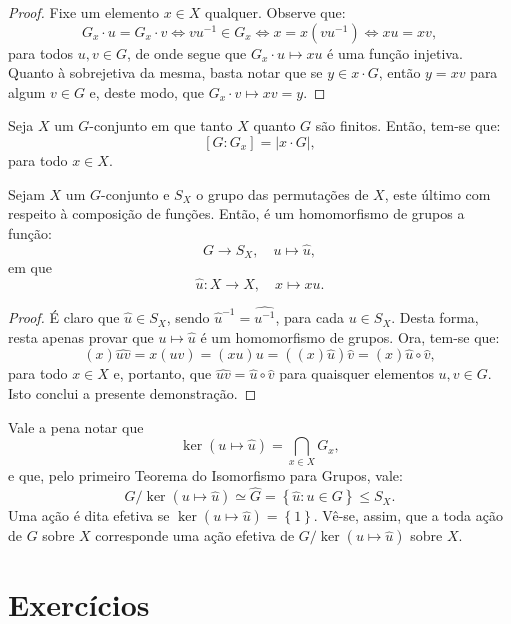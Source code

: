 \begin{proof}
  Fixe um elemento $x\in{X}$ qualquer. Observe que:
  \[
    G_{x}\cdot{u}=G_{x}\cdot{v}\iff{vu^{-1}\in{G_{x}}}\iff{x=x(vu^{-1})}\iff{xu=xv},
  \]
  para todos $u,v\in{G}$, de onde segue que $G_{x}\cdot{u}\mapsto{xu}$ é uma função injetiva. Quanto à sobrejetiva da mesma, basta notar que se $y\in{x\cdot{G}}$, então $y=xv$ para algum $v\in{G}$ e, deste modo, que $G_{x}\cdot{v}\mapsto{xv}=y$.
\end{proof}

\begin{corollary}
  Seja $X$ um $G$-conjunto em que tanto $X$ quanto $G$ são finitos. Então, tem-se que:
  \[
    [G:G_{x}]=|x\cdot{G}|,
  \]
  para todo $x\in{X}$.
\end{corollary}

\begin{proposition}
  Sejam $X$ um $G$-conjunto e $S_{X}$ o grupo das permutações de $X$, este último com respeito à composição de funções. Então, é um homomorfismo de grupos a função:
  \[
    G\to{S_{X}},\quad{u\mapsto\widehat{u}},
  \]
  em que
  \[
    \widehat{u}:X\to{X},\quad{x\mapsto{xu}}.
  \]
\end{proposition}

\begin{proof}
  É claro que $\widehat{u}\in{S_{X}}$, sendo $\widehat{u}^{-1}=\widehat{u^{-1}}$, para cada $u\in{S_{X}}$. Desta forma, resta apenas provar que $u\mapsto{\widehat{u}}$ é um homomorfismo de grupos. Ora, tem-se que:
  \[
    (x)\widehat{uv}=x(uv)=(xu)u=((x)\widehat{u})\widehat{v}=(x)\widehat{u}\circ\widehat{v},
  \]
  para todo $x\in{X}$ e, portanto, que $\widehat{uv}=\widehat{u}\circ\widehat{v}$ para quaisquer elementos $u,v\in{G}$. Isto conclui a presente demonstração.
\end{proof}

Vale a pena notar que
\[
  \ker\left(u\mapsto{\widehat{u}}\right)=\bigcap_{x\in{X}}G_{x},
\]
e que, pelo primeiro Teorema do Isomorfismo para Grupos, vale:
\[
  G/\ker\left(u\mapsto{\widehat{u}}\right)\simeq\widehat{G}=\left\{\widehat{u}:u\in{G}\right\}\leqslant{S_{X}}.
\]
Uma ação é dita efetiva se $\ker\left(u\mapsto{\widehat{u}}\right)=\left\{1\right\}$. Vê-se, assim, que a toda ação de $G$ sobre $X$ corresponde uma ação efetiva de $G/\ker\left(u\mapsto\widehat{u}\right)$ sobre $X$.

\section*{Exercícios}

